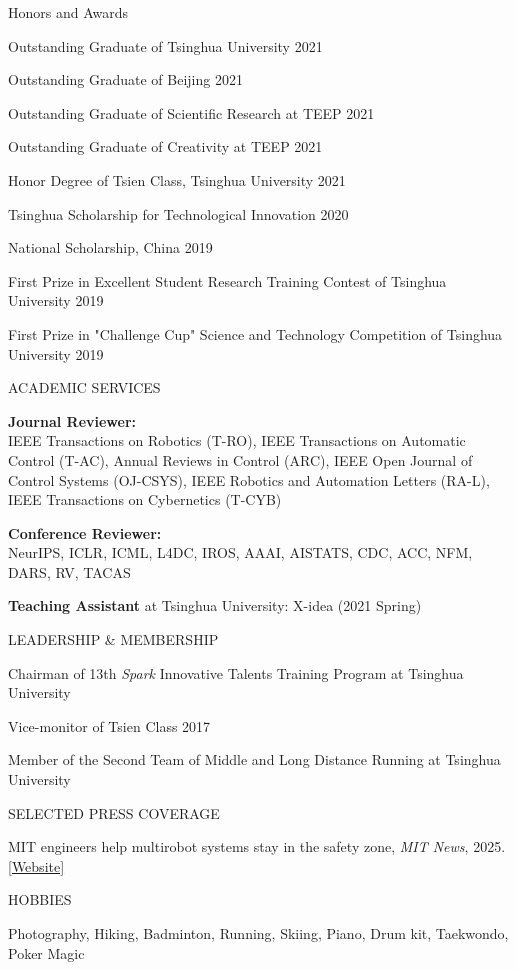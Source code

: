 \documentclass{resume} %
\begin{document}
	\begin{rSection}{Honors and Awards} {} \itemsep -2pt {}  
		\item Outstanding Graduate of Tsinghua University \hfill{2021}
		\item Outstanding Graduate of Beijing \hfill{2021}
		\item Outstanding Graduate of Scientific Research at TEEP \hfill{2021}
		\item Outstanding Graduate of Creativity at TEEP \hfill{2021}
		\item Honor Degree of Tsien Class, Tsinghua University \hfill{2021}
		\item Tsinghua Scholarship for Technological Innovation \hfill{2020}
		\item National Scholarship, China \hfill{2019}
		\item First Prize in Excellent Student Research Training Contest of Tsinghua University \hfill{2019}
		\item First Prize in "Challenge Cup" Science and Technology Competition of Tsinghua University \hfill{2019}
	\end{rSection}

	\begin{rSection}{ACADEMIC SERVICES}
		\item \textbf{Journal Reviewer:} \\IEEE Transactions on Robotics (T-RO), IEEE Transactions on Automatic Control (T-AC), Annual Reviews in Control (ARC), IEEE Open Journal of Control Systems (OJ-CSYS), IEEE Robotics and Automation Letters (RA-L), IEEE Transactions on Cybernetics (T-CYB)
		\item \textbf{Conference Reviewer:} \\NeurIPS, ICLR, ICML, L4DC, IROS, AAAI, AISTATS, CDC, ACC, NFM, DARS, RV, TACAS
		\item \textbf{Teaching Assistant} at Tsinghua University: X-idea (2021 Spring)
	\end{rSection}

	\begin{rSection}{LEADERSHIP \& MEMBERSHIP}
		\item Chairman of 13th \textsl{Spark} Innovative Talents Training Program at Tsinghua University
		\item Vice-monitor of Tsien Class 2017
		\item Member of the Second Team of Middle and Long Distance Running at Tsinghua University
	\end{rSection}

	\begin{rSection}{SELECTED PRESS COVERAGE}
		\item MIT engineers help multirobot systems stay in the safety zone, \textit{MIT News}, 2025. \href{https://news.mit.edu/2025/mit-engineers-help-multirobot-systems-stay-safety-zone-0131}{[Website]}
	\end{rSection}

	\begin{rSection}{HOBBIES}
		\item Photography, Hiking, Badminton, Running, Skiing, Piano, Drum kit, Taekwondo, Poker Magic
	\end{rSection}
	
\end{document}
